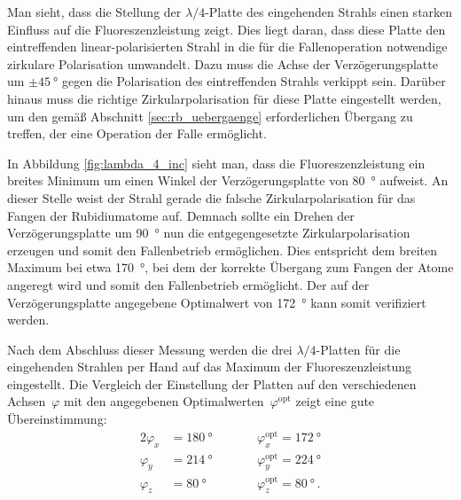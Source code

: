 \documentclass[11pt, a4paper]{article}
\numberwithin{equation}{section}
\begin{document}
Man sieht, dass die Stellung der $\lambda / 4$-Platte des eingehenden Strahls einen starken Einfluss auf die Fluoreszenzleistung zeigt.
Dies liegt daran, dass diese Platte den eintreffenden linear-polarisierten Strahl in die für die Fallenoperation notwendige zirkulare Polarisation umwandelt.
Dazu muss die Achse der Verzögerungsplatte um $\pm\SI{45}{\degree}$ gegen die Polarisation des eintreffenden Strahls verkippt sein.
Darüber hinaus muss die richtige Zirkularpolarisation für diese Platte eingestellt werden, um den gemäß Abschnitt \ref{sec:rb_uebergaenge} erforderlichen Übergang zu treffen, der eine Operation der Falle ermöglicht.

In Abbildung \ref{fig:lambda_4_inc} sieht man, dass die Fluoreszenzleistung ein breites Minimum um einen Winkel der Verzögerungsplatte von \SI{80}{\degree} aufweist.
An dieser Stelle weist der Strahl gerade die falsche Zirkularpolarisation für das Fangen der Rubidiumatome auf.
Demnach sollte ein Drehen der Verzögerungsplatte um \SI{90}{\degree} nun die entgegengesetzte Zirkularpolarisation erzeugen und somit den Fallenbetrieb ermöglichen.
Dies entspricht dem breiten Maximum bei etwa \SI{170}{\degree}, bei dem der korrekte Übergang zum Fangen der Atome angeregt wird und somit den Fallenbetrieb ermöglicht.
Der auf der Verzögerungsplatte angegebene Optimalwert von \SI{172}{\degree} kann somit verifiziert werden.

Nach dem Abschluss dieser Messung werden die drei $\lambda / 4$-Platten für die eingehenden Strahlen per Hand auf das Maximum der Fluoreszenzleistung eingestellt.
Die Vergleich der Einstellung der Platten auf den verschiedenen Achsen~$\varphi$ mit den angegebenen Optimalwerten~$\varphi^\mathrm{opt}$ zeigt eine gute Übereinstimmung:
\begin{alignat*}{2}
\varphi_x &= \SI{180}{\degree} \qquad &&\varphi_x^\mathrm{opt} = \SI{172}{\degree}\\
\varphi_y &= \SI{214}{\degree} \qquad &&\varphi_y^\mathrm{opt} = \SI{224}{\degree}\\
\varphi_z &= \SI{80}{\degree} \qquad &&\varphi_z^\mathrm{opt} = \SI{80}{\degree} \, \text{.}
\end{alignat*}
\end{document}
